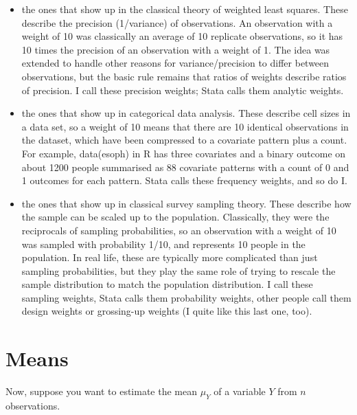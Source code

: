 \documentclass[fleqn,10pt]{latex/stylish_article} %
\providecommand{\tightlist}{%
  \setlength{\itemsep}{0pt}\setlength{\parskip}{0pt}}
\begin{document}
\begin{itemize}
\tightlist
\item
  the ones that show up in the classical theory of weighted least squares. These describe the precision (1/variance) of observations. An observation with a weight of 10 was classically an average of 10 replicate observations, so it has 10 times the precision of an observation with a weight of 1. The idea was extended to handle other reasons for variance/precision to differ between observations, but the basic rule remains that ratios of weights describe ratios of precision. I call these precision weights; Stata calls them analytic weights.\\
\item
  the ones that show up in categorical data analysis. These describe cell sizes in a data set, so a weight of 10 means that there are 10 identical observations in the dataset, which have been compressed to a covariate pattern plus a count. For example, data(esoph) in R has three covariates and a binary outcome on about 1200 people summarised as 88 covariate patterns with a count of 0 and 1 outcomes for each pattern. Stata calls these frequency weights, and so do I.\\
\item
  the ones that show up in classical survey sampling theory. These describe how the sample can be scaled up to the population. Classically, they were the reciprocals of sampling probabilities, so an observation with a weight of 10 was sampled with probability 1/10, and represents 10 people in the population. In real life, these are typically more complicated than just sampling probabilities, but they play the same role of trying to rescale the sample distribution to match the population distribution. I call these sampling weights, Stata calls them probability weights, other people call them design weights or grossing-up weights (I quite like this last one, too).
\end{itemize}

\hypertarget{means}{%
\section{Means}\label{means}}

Now, suppose you want to estimate the mean \(\mu_Y\) of a variable \(Y\) from \(n\) observations.
\end{document}
